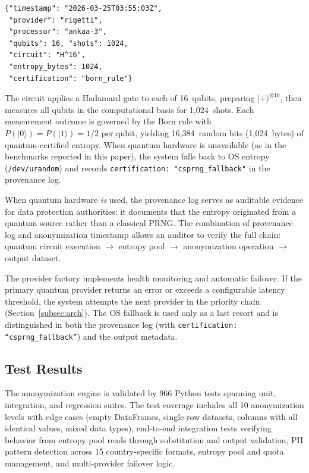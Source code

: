 \documentclass[journal]{IEEEtran}
\begin{document}
{\small\begin{verbatim}
{"timestamp": "2026-03-25T03:55:03Z",
 "provider": "rigetti",
 "processor": "ankaa-3",
 "qubits": 16, "shots": 1024,
 "circuit": "H^16",
 "entropy_bytes": 1024,
 "certification": "born_rule"}
\end{verbatim}}

The circuit applies a Hadamard gate to each of 16~qubits, preparing $|{+}\rangle^{\otimes 16}$, then measures all qubits in the computational basis for 1,024~shots. Each measurement outcome is governed by the Born rule with $P(|0\rangle) = P(|1\rangle) = 1/2$ per qubit, yielding 16,384~random bits (1,024~bytes) of quantum-certified entropy. When quantum hardware is unavailable (as in the benchmarks reported in this paper), the system falls back to OS entropy (\texttt{/dev/urandom}) and records \texttt{certification: "csprng\_fallback"} in the provenance log.

When quantum hardware \emph{is} used, the provenance log serves as auditable evidence for data protection authorities: it documents that the entropy originated from a quantum source rather than a classical PRNG. The combination of provenance log and anonymization timestamp allows an auditor to verify the full chain: quantum circuit execution $\to$ entropy pool $\to$ anonymization operation $\to$ output dataset.

The provider factory implements health monitoring and automatic failover. If the primary quantum provider returns an error or exceeds a configurable latency threshold, the system attempts the next provider in the priority chain (Section~\ref{subsec:arch}). The OS fallback is used only as a last resort and is distinguished in both the provenance log (with \texttt{certification: ``csprng\_fallback''}) and the output metadata.

\subsection{Test Results}
\label{subsec:tests}

The anonymization engine is validated by 966 Python tests spanning unit, integration, and regression suites. The test coverage includes all 10 anonymization levels with edge cases (empty DataFrames, single-row datasets, columns with all identical values, mixed data types), end-to-end integration tests verifying behavior from entropy pool reads through substitution and output validation, PII pattern detection across 15 country-specific formats, entropy pool and quota management, and multi-provider failover logic.
\end{document}
